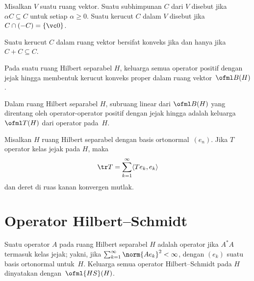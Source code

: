
\begin{defn} Misalkan $V$ suatu ruang vektor. Suatu subhimpunan $C$ dari $V$ disebut
 jika $\alpha C \subseteq C$ untuk setiap $\alpha \ge 0$. Suatu kerucut $C$ dalam $V$ disebut
 jika $C \cap (-C) = \{\vc 0\}$.
\end{defn}

 \begin{prop} Suatu kerucut $C$ dalam ruang vektor bersifat konveks jika dan hanya jika $C + C \subseteq C$.
\end{prop}

\begin{exam} Pada suatu ruang Hilbert separabel $H$, keluarga semua operator positif dengan jejak hingga membentuk kerucut konveks proper dalam ruang
vektor~$\ofml B(H)$.
\end{exam}

\begin{defn} Dalam ruang Hilbert separabel $H$, subruang linear dari $\ofml B(H)$ yang direntang oleh operator-operator positif dengan jejak hingga
adalah keluarga $\ofml T(H)$ dari operator
 pada~$H$.
\end{defn}

\begin{prop} Misalkan $H$ ruang Hilbert separabel dengan basis ortonormal~$(e_n)$. Jika $T$ operator kelas jejak pada $H$, maka
   \[ \tr T = \sum_{k=1}^\infty \langle Te_k,e_k \rangle \]
dan deret di ruas kanan konvergen mutlak.
\end{prop}
















\section{Operator Hilbert--Schmidt}

\begin{defn} Suatu operator $A$ pada ruang Hilbert separabel $H$ adalah operator
 jika $A^*A$ termasuk kelas jejak; yakni, jika $\sum_{k=1}^\infty \norm{Ae_k}^2 < \infty$,
dengan $(e_k)$ suatu basis ortonormal untuk~$H$. Keluarga semua operator Hilbert--Schmidt pada $H$
dinyatakan dengan~$\ofml{HS}(H)$.
\end{defn}

